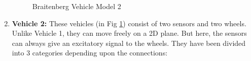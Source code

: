 \documentclass[main.tex]{subfiles}
\begin{document}
\begin{enumerate}
        \begin{figure}[b]%
            \centering
            \qquad
            \caption{Braitenberg Vehicle Model 2}%
            \label{fig:vehicle2}%
        \end{figure}

        \item \textbf{Vehicle 2:} These vehicles (in Fig \ref{fig:vehicle2}) consist of two sensors and two wheels. Unlike Vehicle 1, they can move freely on a 2D plane. But here, the sensors can always give an excitatory signal to the wheels. They have been divided into 3 categories depending upon the connections:


\end{enumerate}
\end{document}
